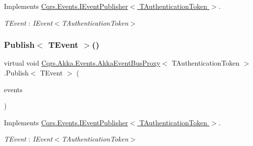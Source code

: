 Implements \hyperlink{interfaceCqrs_1_1Events_1_1IEventPublisher_a02f0db0bc9b3aa1c7f766f58f8422ee3_a02f0db0bc9b3aa1c7f766f58f8422ee3}{Cqrs.\+Events.\+I\+Event\+Publisher$<$ T\+Authentication\+Token $>$}.

\begin{Desc}
\item[Type Constraints]\begin{description}
\item[{\em T\+Event} : {\em I\+Event$<$T\+Authentication\+Token$>$}]\end{description}
\end{Desc}
\mbox{\label{classCqrs_1_1Akka_1_1Events_1_1AkkaEventBusProxy_af4c202eaab00ed2fb6160d5b114d935c_af4c202eaab00ed2fb6160d5b114d935c}} 
\subsubsection{\texorpdfstring{Publish$<$ T\+Event $>$()}{Publish< TEvent >()}\hspace{0.1cm}{\footnotesize\ttfamily [2/2]}}
{\footnotesize\ttfamily virtual void \hyperlink{classCqrs_1_1Akka_1_1Events_1_1AkkaEventBusProxy}{Cqrs.\+Akka.\+Events.\+Akka\+Event\+Bus\+Proxy}$<$ T\+Authentication\+Token $>$.Publish$<$ T\+Event $>$ (\begin{DoxyParamCaption}\item[{I\+Enumerable$<$ T\+Event $>$}]{events }\end{DoxyParamCaption})\hspace{0.3cm}{\ttfamily [virtual]}}



Implements \hyperlink{interfaceCqrs_1_1Events_1_1IEventPublisher_a2cbcc3d2c24d015abef6337714ec51ff_a2cbcc3d2c24d015abef6337714ec51ff}{Cqrs.\+Events.\+I\+Event\+Publisher$<$ T\+Authentication\+Token $>$}.

\begin{Desc}
\item[Type Constraints]\begin{description}
\item[{\em T\+Event} : {\em I\+Event$<$T\+Authentication\+Token$>$}]\end{description}
\end{Desc}


